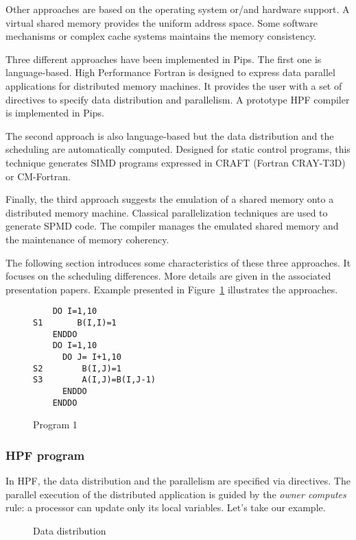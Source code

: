 Other approaches are  based on the operating system or/and 
hardware support. A virtual shared memory provides the uniform address space.
Some software mechanisms or complex cache systems maintains the memory consistency.


Three different approaches have been implemented in Pips. The first one
is language-based. High Performance Fortran is designed to express data
parallel applications for distributed memory machines. It provides the
user with  a set of directives to specify data distribution and parallelism. A prototype  HPF compiler  is implemented in Pips.

The second  approach is also language-based but the data  distribution and the scheduling are 
automatically computed. Designed for static control programs, this technique
 generates SIMD programs expressed  in CRAFT (Fortran CRAY-T3D) or CM-Fortran.

Finally, the third approach  suggests the emulation of a shared memory onto a
distributed memory machine. Classical parallelization techniques are used
to generate SPMD code. The compiler manages the emulated shared memory and the maintenance of memory coherency.

The following section introduces some characteristics of  these three
 approaches. It focuses on the scheduling differences. More details are 
given   in the associated presentation papers.
 Example presented  in Figure~\ref{ex1} illustrates the approaches.


\begin{figure}[htp]
\begin{verbatim}
    DO I=1,10
S1       B(I,I)=1
    ENDDO
    DO I=1,10
      DO J= I+1,10
S2        B(I,J)=1
S3        A(I,J)=B(I,J-1)
      ENDDO
    ENDDO  
\end{verbatim}
\caption{Program 1}
\label{ex1}
\end{figure}

\subsubsection{HPF program}

In HPF, the  data distribution and the parallelism are specified
 via directives. The
parallel execution of the distributed application is guided by the {\it
owner computes} rule: a processor can update only its local variables. Let's take our example. 

\begin{figure}[htp]
\caption{Data distribution}
\label{hpfc}
\end{figure}

